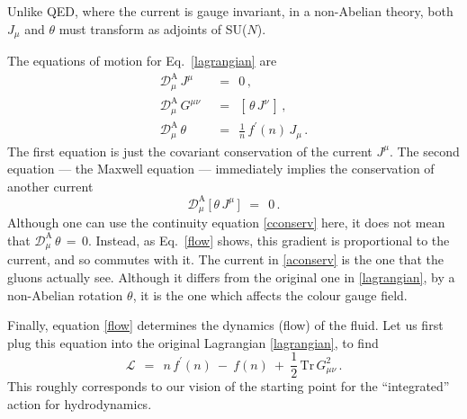 \documentclass[epsfig,12pt]{article}
\def\beq{\begin{equation}}
\def\eeq{\end{equation}}
\newcommand{\p}{\partial}
\newcommand{\md}{\mathcal{D}}
\newcommand{\ml}{\mathcal{L}}
\newcommand{\Tr}{\text{Tr}}
\begin{document}
	Unlike QED, where the current is gauge invariant, in a non-Abelian theory, both $ J_\mu $
	and $ \theta $ must transform as adjoints of SU($N$).

	The equations of motion for Eq.~\eqref{lagrangian} are
\begin{align}
%
\label{cconserv}
	\md^\text{A}_\mu\, J^\mu     & ~~=~~    0\,,
	\\[3.4mm]
%
\label{maxwell}
	\md^\text{A}_\mu\, G^{\mu\nu}     & ~~=~~    [\, \theta\, J^\nu \,]\,,
	\\[2mm]
%
\label{flow}
	\md^\text{A}_\mu\, \theta     & ~~=~~    \frac{1}{n}\, f^\prime(n)\, J_\mu\,.
\end{align}
	The first equation is just the covariant conservation of the current $ J^\mu $.
	The second equation --- the Maxwell equation --- immediately implies the conservation
	of another current
\beq
\label{aconserv}
	\md^\text{A}_\mu\, \big[\, \theta\, J^\mu \,\big]    ~~=~~    0\,.
\eeq
	Although one can use the continuity equation \eqref{cconserv} here, it does not mean
	that $ \md^\text{A}_\mu\, \theta  \,=\, 0 $.
	Instead, as Eq.~\eqref{flow} shows, this gradient is proportional to the current,
        and so commutes with it.
	The current in \eqref{aconserv} is the one that the gluons actually see.
	Although it differs from the original one in \eqref{lagrangian},
	by a non-Abelian rotation $ \theta $,
	it is the one which affects the colour gauge field.


	Finally, equation \eqref{flow} determines the dynamics (flow) of the fluid.
	Let us first plug this equation into the original Lagrangian \eqref{lagrangian}, to find
\beq
	\ml    ~~=~~    n\, f^\prime(n)  ~-~  f(n)  ~+~ \frac{1}{2}\, \Tr\, G_{\mu\nu}^2\,.
\eeq
	This roughly corresponds to our vision of the starting point for the ``integrated'' action for
	hydrodynamics.


\end{document}
